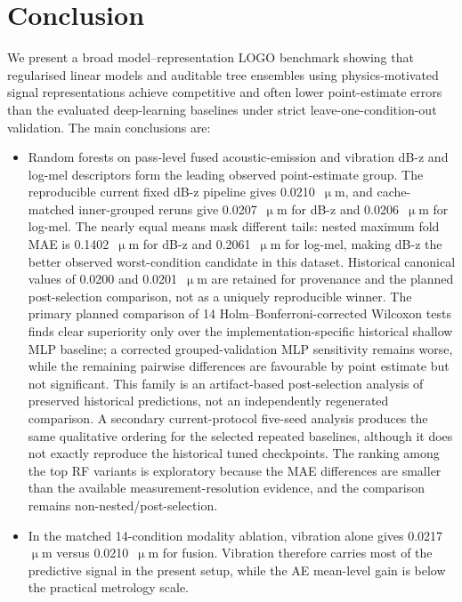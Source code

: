 \section{Conclusion}\label{conclusion}

We present a broad model--representation LOGO benchmark showing that regularised linear models and auditable tree ensembles
using physics-motivated signal representations achieve competitive and often lower
point-estimate errors than the evaluated deep-learning baselines under
strict leave-one-condition-out validation. The main conclusions are:
\begin{itemize}
\tightlist
\item
  Random forests on pass-level fused acoustic-emission and vibration
	  dB-z and log-mel descriptors form the leading observed point-estimate
	  group. The reproducible current fixed dB-z pipeline gives
	  0.0210~\(\upmu\)m, and cache-matched inner-grouped reruns give
	  0.0207~\(\upmu\)m for dB-z and 0.0206~\(\upmu\)m for log-mel.
	  The nearly equal means mask different tails: nested maximum fold MAE is
	  0.1402~\(\upmu\)m for dB-z and 0.2061~\(\upmu\)m for log-mel, making
	  dB-z the better observed worst-condition candidate in this dataset.
	  Historical canonical values of 0.0200 and 0.0201~\(\upmu\)m are retained
	  for provenance and the planned post-selection comparison, not as a
	  uniquely reproducible winner. The primary planned comparison of 14
  Holm--Bonferroni-corrected Wilcoxon tests finds clear superiority only
  over the implementation-specific historical shallow MLP baseline; a corrected
  grouped-validation MLP sensitivity remains worse, while the remaining pairwise differences are
  favourable by point estimate but not significant. This family is an
  artifact-based post-selection analysis of preserved historical predictions,
  not an independently regenerated comparison. A secondary current-protocol
  five-seed analysis produces the same qualitative ordering for the selected
  repeated baselines, although it does not exactly reproduce the historical
  tuned checkpoints. The ranking among the
  top RF variants is exploratory because the MAE differences are smaller
  than the available measurement-resolution evidence, and the comparison
	  remains non-nested/post-selection.
\item
	  In the matched 14-condition modality ablation, vibration alone gives
	  0.0217~\(\upmu\)m versus 0.0210~\(\upmu\)m for fusion. Vibration therefore
	  carries most of the predictive signal in the present setup, while the
	  AE mean-level gain is below the practical metrology scale.

\end{itemize}
